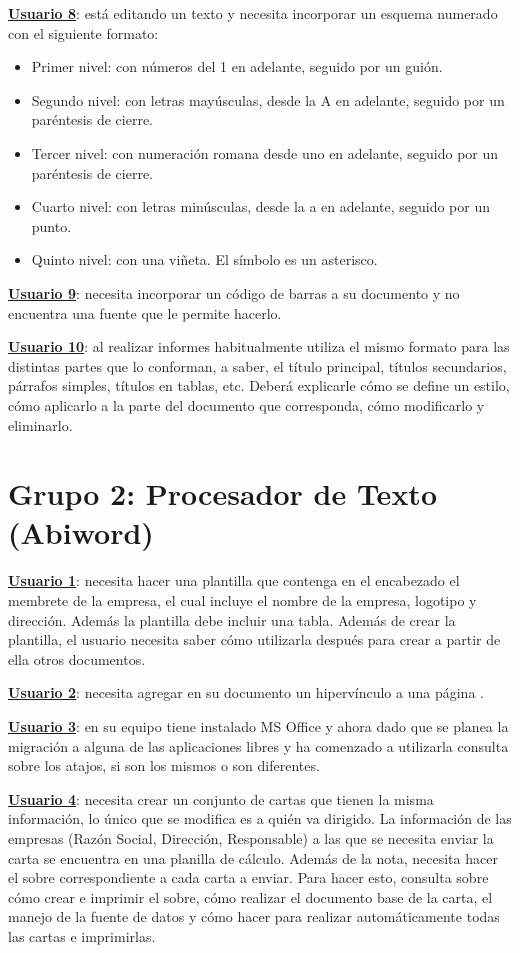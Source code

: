 \documentclass[12pt]{article}
\begin{document}
\textbf{\underline{Usuario 8}}: está editando un texto y necesita incorporar un esquema numerado con el siguiente formato: 
\begin{itemize}
\item Primer nivel: con números del 1 en adelante, seguido por un guión.
\item Segundo nivel: con letras mayúsculas, desde la A en adelante, seguido por un paréntesis de cierre.
\item Tercer nivel: con numeración romana desde uno en adelante, seguido por un paréntesis de cierre.
\item Cuarto nivel: con letras minúsculas, desde la a en adelante, seguido por un punto.
\item Quinto nivel: con una viñeta. El símbolo es un asterisco.
\end{itemize}

\textbf{\underline{Usuario 9}}: necesita incorporar un código de barras a su documento y no encuentra una fuente que le permite hacerlo.

\textbf{\underline{Usuario 10}}: al realizar informes habitualmente utiliza el mismo formato para las distintas partes que lo conforman, a saber, el título principal, títulos secundarios, párrafos simples, títulos en tablas, etc. Deberá explicarle cómo se define un estilo, cómo aplicarlo a la parte del documento que corresponda, cómo modificarlo y eliminarlo.

\section*{\textbf{Grupo 2: Procesador de Texto (Abiword)}}

\textbf{\underline{Usuario 1}}: necesita hacer una plantilla que contenga en el encabezado el membrete de la empresa, el cual incluye el nombre de la empresa, logotipo y dirección. Además la plantilla debe incluir una tabla. 
Además de crear la plantilla, el usuario necesita saber cómo utilizarla después para crear a partir de ella otros documentos.

\textbf{\underline{Usuario 2}}: necesita agregar en su documento un hipervínculo a una página .

\textbf{\underline{Usuario 3}}: en su equipo tiene instalado MS Office y ahora dado que se planea la migración a alguna de las aplicaciones libres y ha comenzado a utilizarla consulta sobre los atajos, si son los mismos o son diferentes.

\textbf{\underline{Usuario 4}}: necesita crear un conjunto de cartas que tienen la misma información, lo único que se modifica es a quién va dirigido. La información de las empresas (Razón Social, Dirección, Responsable) a las que se necesita enviar la carta se encuentra en una planilla de cálculo.
Además de la nota, necesita hacer el sobre correspondiente a cada carta a enviar. Para hacer esto, consulta sobre cómo crear e imprimir el sobre, cómo realizar el documento base de la carta, el manejo de la fuente de datos y cómo hacer para realizar automáticamente todas las cartas e imprimirlas.
\end{document}
